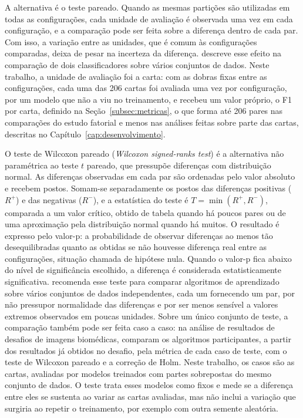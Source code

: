 \documentclass[
    12pt,                %
    openright,           %
    oneside,             %
    a4paper,             %
    english,             %
    brazil               %
]{abntex2}
\begin{document}
A alternativa é o teste pareado. Quando as mesmas partições são utilizadas
em todas as configurações, cada unidade de avaliação é observada uma vez em
cada configuração, e a comparação pode ser feita sobre a diferença dentro de
cada par. Com isso, a variação entre as unidades, que é comum às
configurações comparadas, deixa de pesar na incerteza da diferença.
 descreve esse efeito na comparação de dois
classificadores sobre vários conjuntos de dados. Neste trabalho, a unidade
de avaliação foi a carta: com as dobras fixas entre as configurações, cada
uma das 206 cartas foi avaliada uma vez por configuração, por um modelo que
não a viu no treinamento, e recebeu um valor próprio, o F1 por carta,
definido na Seção~\ref{subsec:metricas}, o que forma até 206 pares nas
comparações do estudo fatorial e menos nas análises feitas sobre parte
das cartas, descritas no Capítulo~\ref{cap:desenvolvimento}.

O teste de Wilcoxon pareado (\textit{Wilcoxon signed-ranks test}) é a
alternativa não paramétrica ao teste $t$ pareado, que pressupõe
diferenças com distribuição normal. As diferenças observadas em
cada par são ordenadas pelo valor absoluto e recebem postos. Somam-se
separadamente os postos das diferenças positivas ($R^+$) e das negativas
($R^-$), e a estatística do teste é $T = \min(R^+, R^-)$, comparada a um valor
crítico, obtido de tabela quando há poucos pares ou de uma aproximação
pela distribuição normal quando há muitos. O resultado é expresso pelo
valor-p: a probabilidade de observar diferenças ao menos tão desequilibradas
quanto as obtidas se não houvesse diferença real entre as configurações,
situação chamada de hipótese nula. Quando o valor-p fica abaixo do nível de
significância escolhido, a diferença é considerada estatisticamente
significativa.  recomenda esse teste para comparar
algoritmos de aprendizado sobre vários conjuntos de dados independentes,
cada um fornecendo um par, por não pressupor normalidade das diferenças e
por ser menos sensível a valores extremos observados em poucas unidades.
Sobre um único conjunto de teste, a comparação também pode ser feita caso a
caso: na análise de resultados de desafios de imagens biomédicas,
 comparam os algoritmos participantes, a partir
dos resultados já obtidos no desafio, pela métrica de cada caso de teste,
com o teste de Wilcoxon pareado e a correção de Holm. Neste trabalho, os
casos são as cartas, avaliadas por modelos treinados com partes sobrepostas
do mesmo conjunto de dados. O teste trata esses modelos como fixos e mede se
a diferença entre eles se sustenta ao variar as cartas avaliadas, mas não
inclui a variação que surgiria ao repetir o treinamento, por exemplo com
outra semente aleatória.
\end{document}
